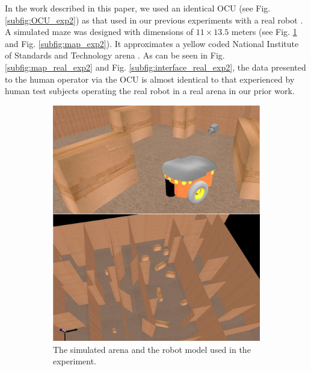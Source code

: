 \documentclass[a4paper,12pt,oneside,openright]{bhamthesis}
\begin{document}
In the work described in this paper, we used an identical OCU (see Fig. \ref{subfig:OCU_exp2}) as that used in our previous experiments with a real robot \citep{Chiou2015}. A simulated maze was designed with dimensions of  $11 \times 13.5$ meters (see Fig. \ref{subfig:arena_exp2} and Fig. \ref{subfig:map_exp2}). It approximates a yellow coded National Institute of Standards and Technology arena \citep{Jacoff2003a}. As can be seen in Fig. \ref{subfig:map_real_exp2} and Fig. \ref{subfig:interface_real_exp2}, the data presented to the human operator via the OCU is almost identical to that experienced by human test subjects operating the real robot in a real arena in our prior work.
	
\begin{figure}
	\centering
	\begin{subfigure}[b]{0.45\textwidth}
		\centering
		\includegraphics[width=\textwidth]{chapter4_fig/sim2.jpeg}
		\caption{The simulated arena and the robot model used in the experiment.}
		\label{subfig:arena_exp2}
	\end{subfigure}
	\hfill
	\begin{subfigure}[b]{0.35\textwidth}
		\centering

\end{subfigure}
\end{figure}
\end{document}
